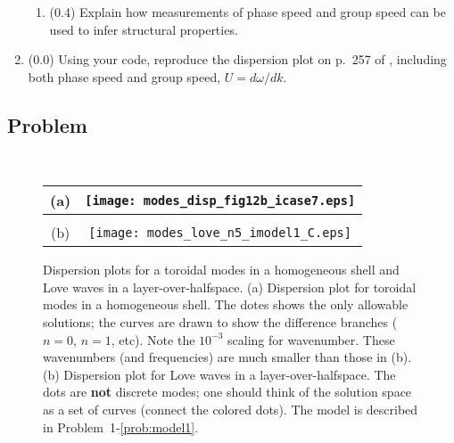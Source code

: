 \documentclass[11pt,titlepage,fleqn]{article}
\begin{document}
\begin{enumerate}
\begin{enumerate}
\item (0.4) Explain how measurements of phase speed and group speed can be used to infer structural properties.
\end{enumerate}


\item (0.0) Using your code, reproduce the dispersion plot on p.~257 of \citet{AkiRichardsE2}, including both phase speed and group speed, $U = d\omega/dk$.


\end{enumerate}


\subsection*{Problem} \howmuchtime\

\pagebreak






\clearpage\pagebreak
\begin{figure}
\centering
\begin{tabular}{cc}
(a) & \texttt{[image: modes\_disp\_fig12b\_icase7.eps]} \\ \hline
& \\
(b) & \texttt{[image: modes\_love\_n5\_imodel1\_C.eps]} 
\end{tabular}
\caption[]
{{
Dispersion plots for a toroidal modes in a homogeneous shell and Love waves in a layer-over-halfspace.
(a) Dispersion plot for toroidal modes in a homogeneous shell. The dotes shows the only allowable solutions; the curves are drawn to show the difference branches ($n=0$, $n=1$, etc). 
Note the $10^{-3}$ scaling for wavenumber. These wavenumbers (and frequencies) are much smaller than those in (b).
(b) Dispersion plot for Love waves in a layer-over-halfspace. The dots are {\bf not} discrete modes; one should think of the solution space as a set of curves (\ie connect the colored dots).
The model is described in Problem~1-\ref{prob:model1}.
\label{fig:dots}
}}
\end{figure}
\end{document}

